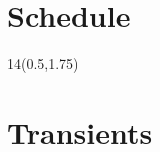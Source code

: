 

\section{Schedule}
\renewcommand{\arraystretch}{1}
\begin{frame}{}
	\begin{textblock}{14}(0.5,1.75)
	\def\myfontsize{footnotesize}
	
	\end{textblock}
\end{frame}





\section{Transients}

